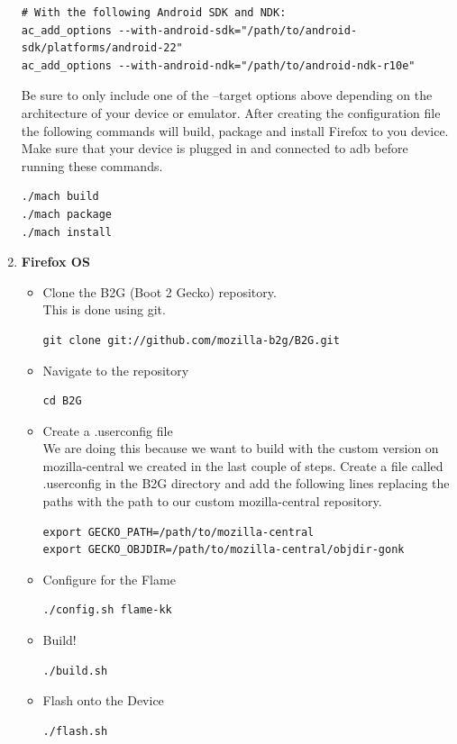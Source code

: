 \documentclass[12pt]{article}
\begin{document}
\begin{enumerate}
\begin{lstlisting}[style=BashInputStyle]
# With the following Android SDK and NDK:
ac_add_options --with-android-sdk="/path/to/android-sdk/platforms/android-22"
ac_add_options --with-android-ndk="/path/to/android-ndk-r10e"
		\end{lstlisting}
Be sure to only include one of the --target options above depending on the architecture of your device or emulator. After creating the configuration file the following commands will build, package and install Firefox to you device.  Make sure that your device is plugged in and connected to adb before running these commands. 
\begin{lstlisting}[style=BashInputStyle]
./mach build
./mach package
./mach install
\end{lstlisting}
		\item \textbf{Firefox OS}
		\begin{itemize}
		\item Clone the B2G (Boot 2 Gecko) repository.  \\
		This is done using git.
\begin{lstlisting}[style=BashInputStyle]
git clone git://github.com/mozilla-b2g/B2G.git
\end{lstlisting}
		\item Navigate to the repository
\begin{lstlisting}[style=BashInputStyle]
cd B2G
\end{lstlisting}
		\item Create a .userconfig file \\
		We are doing this because we want to build with the custom version on mozilla-central we created in the last couple of steps.  Create a file called .userconfig in the B2G directory and add the following lines replacing the paths with the path to our custom mozilla-central repository.
\begin{lstlisting}[style=BashInputStyle]
export GECKO_PATH=/path/to/mozilla-central
export GECKO_OBJDIR=/path/to/mozilla-central/objdir-gonk
\end{lstlisting}
		\item Configure for the Flame \\
\begin{lstlisting}[style=BashInputStyle]
./config.sh flame-kk
\end{lstlisting}
		\item Build!
\begin{lstlisting}[style=BashInputStyle]
./build.sh
\end{lstlisting}
		\item Flash onto the Device
\begin{lstlisting}[style=BashInputStyle]
./flash.sh
\end{lstlisting}
		\end{itemize}
		\end{enumerate}
		
\end{document}

